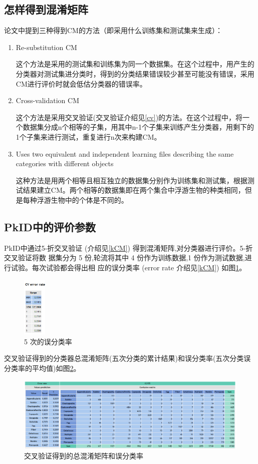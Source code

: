 \documentclass[12pt]{article}
\begin{document}
\subsection{怎样得到混淆矩阵}
论文中提到三种得到CM的方法（即采用什么训练集和测试集来生成）：
    \begin{enumerate}
        \item Re-substitution CM
        
       这个方法是采用的测试集和训练集为同一个数据集。在这个过程中，用产生的分类器对测试集进分类时，得到的分类结果错误较少甚至可能没有错误，采用CM进行评价时就会低估分类器的错误率。
        \item Cross-validation CM
        
        这个方法是采用交叉验证(交叉验证介绍见\ref{cv})的方法。在这个过程中，将一个数据集分成n个相等的子集，用其中n-1个子集来训练产生分类器，用剩下的1个子集来进行测试，重复进行n次来构建CM。
        \item Uses two equivalent and independent learning files describing the same categories with different objects
        
        这种方法是用两个相等且相互独立的数据集分别作为训练集和测试集，根据测试结果建立CM。两个相等的数据集即在两个集合中浮游生物的种类相同，但是每种浮游生物中的个体是不同的。
    \end{enumerate}
    
\subsection{PkID中的评价参数}
PkID中通过5-折交叉验证 (介绍见\ref{kCM}) 得到混淆矩阵,对分类器进行评价。5-折交叉验证将数 据集分为 5 份,轮流将其中 4 份作为训练数据,1 份作为测试数据,进行试验。每次试验都会得出相 应的误分类率 (error rate 介绍见\ref{kCM}) 如图\ref{fig:five}。
    \begin{figure}[!ht]
      \centering 
        \includegraphics[width=0.1\textwidth]{five}
        \caption{5 次的误分类率}
        \label{fig:five}
    \end{figure}
    
    交叉验证得到的分类器总混淆矩阵(五次分类的累计结果)和误分类率(五次分类误分类率的平均值)如图\ref{fig:pkidCM}。
   \begin{figure}[!ht]
      \centering 
        \includegraphics[width=1\textwidth]{pkidCM}
        \caption{交叉验证得到的总混淆矩阵和误分类率}
        \label{fig:pkidCM}
    \end{figure}
    
\end{document}
